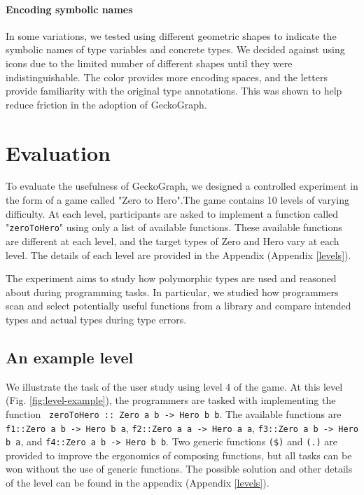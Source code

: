 \paragraph{Encoding symbolic names} In some variations, we tested using different geometric shapes to indicate the symbolic names of type variables and concrete types. We decided against using icons due to the limited number of different shapes until they were indistinguishable. The color provides more encoding spaces, and the letters provide familiarity with the original type annotations. This was shown to help reduce friction in the adoption of GeckoGraph.


\section{Evaluation}
To evaluate the usefulness of GeckoGraph, we designed a controlled experiment in the form of a game called "Zero to Hero".The game contains 10 levels of varying difficulty. At each level, participants are asked to implement a function called "\texttt{zeroToHero}" using only a list of available functions. These available functions are different at each level, and the target types of Zero and Hero vary at each level. The details of each level are provided in the Appendix (Appendix \ref{levels}). 

The experiment aims to study how polymorphic types are used and reasoned about during programming tasks. In particular, we studied how programmers scan and select potentially useful functions from a library and compare intended types and actual types during type errors.


\subsection{An example level}
We illustrate the task of the user study using level 4 of the game. At this level (Fig. \ref{fig:level-example}), the programmers are tasked with implementing the function \texttt{ zeroToHero :: Zero a b -> Hero b b}. The available functions are \texttt{f1::Zero a b -> Hero b a}, \texttt{f2::Zero a a -> Hero a a}, \texttt{f3::Zero a b -> Hero b a}, and \texttt{f4::Zero a b -> Hero b b}. Two generic functions \texttt{(\$)} and \texttt{(.)} are provided to improve the ergonomics of composing functions, but all tasks can be won without the use of generic functions. The possible solution and other details of the level can be found in the appendix (Appendix \ref{levels}).



